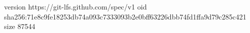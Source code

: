 version https://git-lfs.github.com/spec/v1
oid sha256:71e8c9fe18253db74a093c7333093b2e0bff63226dbb74fd1ffa9d79c285c421
size 87544
